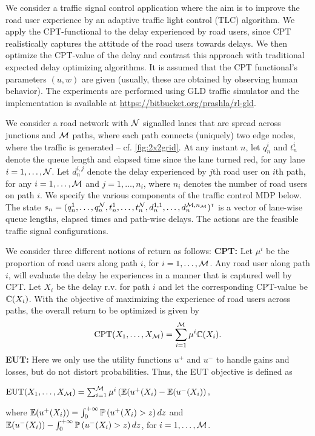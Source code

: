 We consider a traffic signal control application where the aim is to improve the road user experience by an adaptive traffic light control (TLC) algorithm.
We apply the CPT-functional to the delay experienced by road users, since CPT realistically captures the attitude of the road users towards delays. We then optimize the CPT-value of the delay and contrast this approach with traditional expected delay optimizing algorithms. It is assumed that the CPT functional's parameters $(u,w)$ are given (usually, these are obtained by observing human behavior). The experiments are performed using GLD traffic simulator \cite{GLDSim} and the implementation is available at \url{https://bitbucket.org/prashla/rl-gld}.

We consider a road network with $\mathcal{N}$ signalled lanes that are spread across junctions and $\mathcal{M}$ paths, where each path connects (uniquely) two edge nodes, where the traffic is generated -- cf. \cref{fig:2x2grid}. 
At any instant $n$, let $q_n^i$ and $t_n^i$ denote the queue length and elapsed time since the lane turned red, for any lane $i = 1,\ldots, \mathcal{N}$. Let $d_n^{i,j}$ denote the delay experienced by $j$th road user on $i$th path, for any $i=1,\ldots,\mathcal{M}$ and $j=1,\ldots,n_i$, where $n_i$ denotes the number of road users on path $i$.
We specify the various components of the traffic control MDP below.
The state $s_n=(q_n^1,\ldots,q_n^{\mathcal{N}},t_n^1,\ldots,t_n^{\mathcal{N}},d_n^{1,1},\ldots,d_n^{\mathcal{M},n_{\mathcal{M}}})^\mathsf{\scriptscriptstyle T}$ is a vector of lane-wise queue lengths, elapsed times and path-wise delays.
The actions are the feasible traffic signal configurations. 

We consider three different notions of return as follows:
%
\textbf{CPT:} Let $\mu^i$ be the proportion of road users along path $i$, for $i=1,\ldots,\mathcal{M}$. Any road user along path $i$, will evaluate the delay he experiences in a manner that is captured well by CPT. Let $X_i$ be the delay r.v. for path $i$ and let the corresponding CPT-value be $\mathbb{C}(X_i)$. With the objective of maximizing the experience of road users across paths, the overall return to be optimized is given by
\begin{align}
\text{CPT}(X_1,\ldots,X_{\mathcal{M}}) = \sum_{i=1}^{\mathcal{M}} \mu^i \mathbb{C}(X_i).\label{eq:cpt-traffic}
\end{align}
\textbf{EUT:} Here we only use the utility functions $u^+$ and $u^-$ to handle gains and losses, but do not distort probabilities. 
Thus, the EUT objective is defined as\\
\begin{small}
\centerline{$\text{EUT}(X_1,\ldots,X_{\mathcal{M}}) = \sum_{i=1}^{\mathcal{M}} \mu^i \left(\mathbb{E}(u^+(X_i) - \mathbb{E}(u^-(X_i)\right),$}
  \end{small}
where $\mathbb{E}(u^+(X_i)) = \int_0^{+\infty} \mathbb{P}\left( u^+(X_i)>z \right) dz$ and $\mathbb{E}(u^-(X_i)) - \int_0^{+\infty} \mathbb{P}\left( u^-(X_i)>z \right) dz$, for $i=1,\ldots,\mathcal{M}$.


